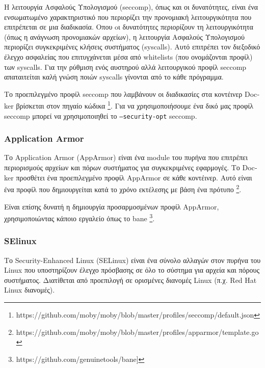 Η λειτουργία Ασφαλούς Υπολογισμού (\textlatin{seccomp}), όπως και οι
δυνατότητες, είναι ένα ενσωματωμένο χαρακτηριστικό που περιορίζει την προνομιακή
λειτουργικότητα που επιτρέπεται σε μια διαδικασία. Οπου oι δυνατότητες
περιορίζουν τη λειτουργικότητα (όπως η ανάγνωση προνομιακών αρχείων), η
λειτουργία Ασφαλούς Υπολογισμού περιορίζει συγκεκριμένες κλήσεις συστήματος
(\textlatin{syscalls}). Αυτό επιτρέπει τον διεξοδικό έλεγχο ασφαλείας που
επιτυγχάνεται μέσα από \textlatin{whitelists} (που ονομάζονται προφίλ) των
\textlatin{syscalls}. Για την ρύθμιση ενός αυστηρού αλλά λειτουργικού προφίλ
\textlatin{seccomp} απαταιτείται καλή γνώση ποιών \textlatin{syscalls} γίνονται
από το κάθε πρόγραμμα.

Το προεπιλεγμένο προφίλ \textlatin{seccomp} που λαμβάνουν οι διαδικασίες στα
κοντέινερ \textlatin{Docker} βρίσκεται στον πηγαίο κώδικα
\footnote{\textlatin{https://github.com/moby/moby/blob/master/profiles/seccomp/default.json}}.
Για να χρησιμοποιήσουμε ένα δικό μας προφίλ \textlatin{seccomp} μπορεί να
χρησιμοποιηθεί το \texttt{\textlatin{--security-opt}} \textlatin{seccomp}.

\subsubsection{\textlatin{Application Armor}}

Το \textlatin{Application Armor (AppArmor)} είναι ένα \textlatin{module} του
πυρήνα που επιτρέπει περιορισμούς αρχείων και πόρων συστήματος για
συγκεκριμένες εφαρμογές. Το \textlatin{Docker} προσθέτει ένα προεπιλεγμένο
προφίλ \textlatin{AppArmor} σε κάθε κοντέινερ. Αυτό είναι ένα προφίλ που
δημιουργείται κατά το χρόνο εκτέλεσης με βάση ένα πρότυπο
\footnote{\textlatin{https://github.com/moby/moby/blob/master/profiles/apparmor/template.go}}.

Είναι επίσης δυνατή η δημιουργία προσαρμοσμένων προφίλ \textlatin{AppArmor}, 
χρησιμοποιώντας κάποιο εργαλείο όπως το \textlatin{bane}
\footnote{\textlatin{https://github.com/genuinetools/bane]}}.

\subsubsection{\textlatin{SElinux}}

Το \textlatin{Security-Enhanced Linux (SELinux)} είναι ένα σύνολο αλλαγών στον
πυρήνα του \textlatin{Linux} που υποστηρίζουν έλεγχο πρόσβασης σε όλο το
σύστημα για αρχεία και πόρους συστήματος. Διατίθεται από προεπιλογή σε
ορισμένες διανομές \textlatin{Linux} (π.χ. \textlatin{Red Hat Linux} διανομές).

